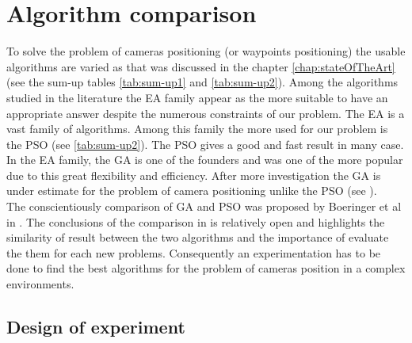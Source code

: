 \section{Algorithm comparison }\label{sec:GAvsPSO} 
%
To solve the problem of cameras positioning (or waypoints positioning) the usable algorithms are varied as that was discussed in the chapter \ref{chap:stateOfTheArt} (see the sum-up tables \ref{tab:sum-up1} and \ref{tab:sum-up2}).
Among the algorithms studied in the literature the EA family appear as the more suitable to have an appropriate answer despite the numerous constraints of our problem. The EA is a vast family of algorithms. Among this family the more used for our problem is the PSO (see \ref{tab:sum-up2}). The PSO gives a good and fast result in many case. In the EA family, the GA is one of the founders and was one of the more popular due to this great flexibility and efficiency.
 After more investigation the GA is under estimate for the problem of camera positioning unlike the PSO (see \citep{33*reddy2012,8*zhou2011,84*xu2011,143*maji2015,193*fu2014,194*fu2010}). \\
 The  conscientiously comparison  of GA and PSO was proposed by Boeringer et al in \citep{78*boeringer2004}. The conclusions  of the comparison in \citep{78*boeringer2004} is relatively open and highlights the similarity of result between the two algorithms and the importance of evaluate the them for each new problems. Consequently an experimentation has to be done to find the best algorithms for the problem of cameras position in a complex environments. 




\subsection{Design of experiment }\label{sec:DoE}


